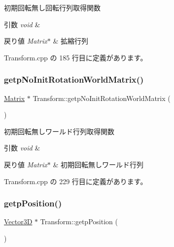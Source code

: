 初期回転無し回転行列取得関数 


\begin{DoxyParams}{引数}
{\em void} & \\
\hline
\end{DoxyParams}

\begin{DoxyRetVals}{戻り値}
{\em Matrix$\ast$} & 拡縮行列 \\
\hline
\end{DoxyRetVals}


 Transform.\+cpp の 185 行目に定義があります。

\mbox{\label{class_transform_a17fb2c084b43710345a261438ae67b7c}} 
\subsubsection{\texorpdfstring{getp\+No\+Init\+Rotation\+World\+Matrix()}{getpNoInitRotationWorldMatrix()}}
{\footnotesize\ttfamily \mbox{\hyperlink{class_matrix}{Matrix}} $\ast$ Transform\+::getp\+No\+Init\+Rotation\+World\+Matrix (\begin{DoxyParamCaption}{ }\end{DoxyParamCaption})}



初期回転無しワールド行列取得関数 


\begin{DoxyParams}{引数}
{\em void} & \\
\hline
\end{DoxyParams}

\begin{DoxyRetVals}{戻り値}
{\em Matrix$\ast$} & 初期回転無しワールド行列 \\
\hline
\end{DoxyRetVals}


 Transform.\+cpp の 229 行目に定義があります。

\mbox{\label{class_transform_a1ed223415917a6b33e5fd7af132f6b9c}} 
\subsubsection{\texorpdfstring{getp\+Position()}{getpPosition()}}
{\footnotesize\ttfamily \mbox{\hyperlink{class_vector3_d}{Vector3D}} $\ast$ Transform\+::getp\+Position (\begin{DoxyParamCaption}{ }\end{DoxyParamCaption})}



